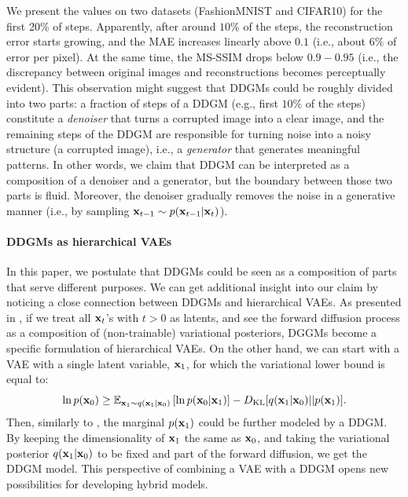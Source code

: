 We present the values on two datasets (FashionMNIST and CIFAR10) for the first 20\% of steps. Apparently, after around $10\%$ of the steps, the reconstruction error starts growing, and the MAE increases linearly above $0.1$ (i.e., about $6\%$ of error per pixel). At the same time, the MS-SSIM drops below $0.9-0.95$ (i.e., the discrepancy between original images and reconstructions becomes perceptually evident). This observation might suggest that DDGMs could be roughly divided into two parts: a fraction of steps of a DDGM (e.g., first $10\%$ of the steps) constitute a \textit{denoiser} that turns a corrupted image into a clear image, and the remaining steps of the DDGM are responsible for turning noise into a noisy structure (a corrupted image), i.e., a \textit{generator} that generates meaningful patterns. In other words, we claim that DDGM can be interpreted as a composition of a denoiser and a generator, but the boundary between those two parts is fluid. Moreover, the denoiser gradually removes the noise in a generative manner (i.e., by sampling ${\mathbf{x}}_{t-1} \sim p({\mathbf{x}}_{t-1}|{\mathbf{x}}_t)$).


\paragraph{DDGMs as hierarchical VAEs} In this paper, we postulate that DDGMs could be seen as a composition of parts that serve different purposes. We can get additional insight into our claim by noticing a close connection between DDGMs and hierarchical VAEs. As presented in \cite{huang2021variational,kingma2021variational,tomczak2022deep}, if we treat all ${\mathbf{x}}_t$'s with $t>0$ as latents, and see the forward diffusion process as a composition of (non-trainable) variational posteriors, DGGMs become a specific formulation of hierarchical VAEs. On the other hand, we can start with a VAE with a single latent variable, ${\mathbf{x}}_1$, for which the variational lower bound is equal to:
\begin{equation}
    \ln p({\mathbf{x}}_0) \geq \mathbb{E}_{{\mathbf{x}}_1 \sim q({\mathbf{x}}_1 | {\mathbf{x}}_0)}\left[\ln p({\mathbf{x}}_0|{\mathbf{x}}_1)\right] - D_{\text{KL}}[q({\mathbf{x}}_1 | {\mathbf{x}}_0)||p({\mathbf{x}}_1)].
\end{equation}
Then, similarly to \cite{vahdat2021score,wehenkel2021diffusion}, the marginal $p({\mathbf{x}}_1)$ could be further modeled by a DDGM. By keeping the dimensionality of ${\mathbf{x}}_1$ the same as ${\mathbf{x}}_0$, and taking the variational posterior $q({\mathbf{x}}_1 | {\mathbf{x}}_0)$ to be fixed and part of the forward diffusion, we get the DDGM model. This perspective of combining a VAE with a DDGM opens new possibilities for developing hybrid models.

